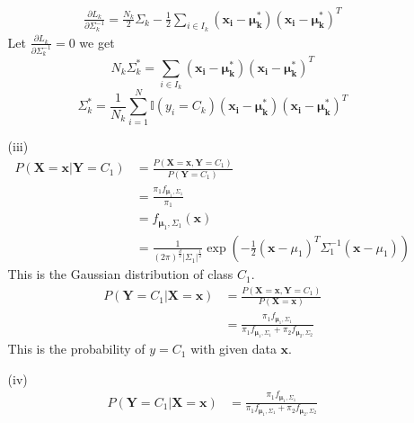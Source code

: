 \documentclass[12pt,a4paper]{article}
\begin{document}
\begin{enumerate}
\begin{enumerate}
                \begin{align*}
                    \frac{\partial L_{k}}{\partial \Sigma_{k}^{-1}} = \frac{N_{k}}{2}\Sigma_{k} - \frac{1}{2}\sum_{i\in I_{k}}(\mathbf{x_{i}-\mu_{k}^{*}}) (\mathbf{x_{i}-\mu_{k}^{*}})^T
                \end{align*}
                Let $\frac{\partial L_{k}}{\partial \Sigma_{k}^{-1}} = 0$ we get 
                \[
                    N_{k}\Sigma_{k}^{*} = \sum_{i\in I_{k}}(\mathbf{x_{i}-\mu_{k}^{*}})(\mathbf{x_{i}-\mu_{k}^{*}})^T
                \]
                \[
                    \Sigma_{k}^{*} = \frac{1}{N_{k}}\sum_{i=1}^{N}\mathbb{I} (y_{i}=C_{k})(\mathbf{x_{i}-\mu_{k}^{*}})(\mathbf{x_{i}-\mu_{k}^{*}})^T
                \]
            \item [(iii)]
                \begin{align*}
                    P(\mathbf{X}=\mathbf{x}|\mathbf{Y}=C_{1}) 
                        &= \frac{P(\mathbf{X}=\mathbf{x}, \mathbf{Y}=C_{1})}{P(\mathbf{Y}=C_{1})} \\
                        &= \frac{\pi_{1}f_{\mathbf{\mu}_{1}, \Sigma_{1}}}{\pi_{1}} \\
                        &= f_{\mathbf{\mu}_{1}, \Sigma_{1}} (\mathbf{x})\\
                        &= \frac{1}{(2\pi)^{\frac{d}{2}} |\Sigma_{1}|^{\frac{1}{2}} } \exp\left( -\frac{1}{2}(\mathbf{x}-\mu_{1})^T\Sigma_{1}^{-1}(\mathbf{x}-\mu_{1})\right)
                \end{align*}
                This is the Gaussian distribution of class $C_{1}$.
                \begin{align*}
                    P(\mathbf{Y}=C_{1}|\mathbf{X}=\mathbf{x}) 
                        &= \frac{P(\mathbf{X}=\mathbf{x}, \mathbf{Y}=C_{1})}{P(\mathbf{X}=\mathbf{x})} \\
                        &= \frac{\pi_{1}f_{\mathbf{\mu}_{1}, \Sigma_{1}}}{\pi_{1}f_{\mathbf{\mu}_{1}, \Sigma_{1}}+\pi_{2}f_{\mathbf{\mu}_{2}, \Sigma_{2}}}
                \end{align*}
                This is the probability of $y=C_{1}$ with given data $\mathbf{x}$.
            \item [(iv)]
                \begin{align*}
                    P(\mathbf{Y}=C_{1}|\mathbf{X}=\mathbf{x}) 
                        &= \frac{\pi_{1}f_{\mathbf{\mu}_{1}, \Sigma_{1}}}{\pi_{1}f_{\mathbf{\mu}_{1}, \Sigma_{1}}+\pi_{2}f_{\mathbf{\mu}_{2}, \Sigma_{2}}}\\

\end{align*}
\end{enumerate}
\end{enumerate}
\end{document}
